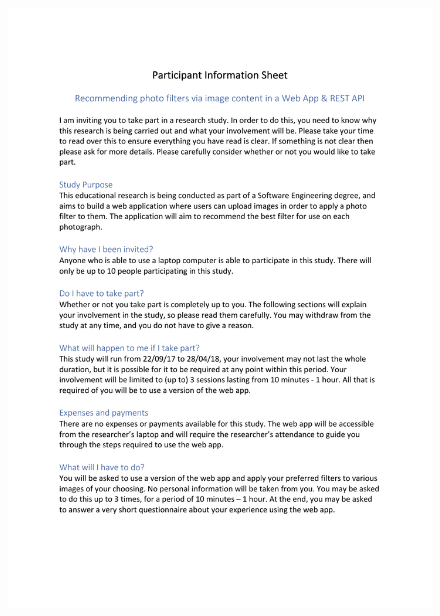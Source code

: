\documentclass[a4paper,12pt]{report}
\begin{document}
\begin{appendices}
    \begin{figure}[h]
      \centering
      \includegraphics[scale=0.8]{pis-1}
    \end{figure}


\end{appendices}
\end{document}
